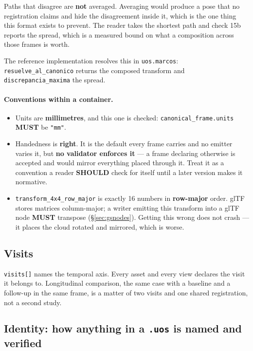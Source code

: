 \documentclass[11pt,a4paper]{article}
\newcommand{\MUST}{\textcolor{uosred}{\textbf{MUST}}}
\newcommand{\SHOULD}{\textcolor{uosamber}{\textbf{SHOULD}}}
\newcommand{\code}[1]{\texttt{\small #1}}
\begin{document}
Paths that disagree are \textbf{not} averaged. Averaging would produce a pose that no
registration claims and hide the disagreement inside it, which is the one thing this format
exists to prevent. The reader takes the shortest path and check 15b reports the spread,
which is a measured bound on what a composition across those frames is worth.

The reference implementation resolves this in \code{uos.marcos}:
\code{resuelve\_al\_canonico} returns the composed transform and
\code{discrepancia\_maxima} the spread.

\paragraph{Conventions within a container.}

\begin{itemize}
  \item Units are \textbf{millimetres}, and this one is checked:
  \code{canonical\_frame.units} \MUST{} be \code{"mm"}.
  \item Handedness is \textbf{right}. It is the default every frame carries and no emitter
  varies it, but \textbf{no validator enforces it} --- a frame declaring otherwise is
  accepted and would mirror everything placed through it. Treat it as a convention a reader
  \SHOULD{} check for itself until a later version makes it normative.
  \item \code{transform\_4x4\_row\_major} is exactly 16 numbers in \textbf{row-major}
  order. glTF stores matrices column-major; a writer emitting this transform into a glTF
  node \MUST{} transpose (\S\ref{sec:gsnodes}). Getting this wrong does not crash --- it
  places the cloud rotated and mirrored, which is worse.
\end{itemize}

\subsection{Visits}

\code{visits[]} names the temporal axis. Every asset and every view declares the visit it
belongs to. Longitudinal comparison, the same case with a baseline and a follow-up in
the same frame, is a matter of two visits and one shared registration, not a second
study.

\subsection{Identity: how anything in a \code{.uos} is named and verified}\label{sec:identity}
\end{document}
